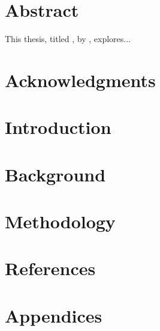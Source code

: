 \documentclass[12pt,a4paper, twoside]{report}
\begin{document}



\newpage
\thispagestyle{empty} %
\mbox{} %
\newpage

\chapter*{Abstract}
This thesis, titled \textit{\ThesisTitle}, by \AuthorName, explores...
\lipsum[1] %


\chapter*{Acknowledgments}
\lipsum[3] %

\tableofcontents
\newpage

\newpage
{}

\chapter{Introduction}


\chapter{Background}


\chapter{Methodology}


\chapter{References}
\thispagestyle{plain}
\printbibliography

\chapter{Appendices}
\begin{appendices}



\end{appendices}
\end{document}
